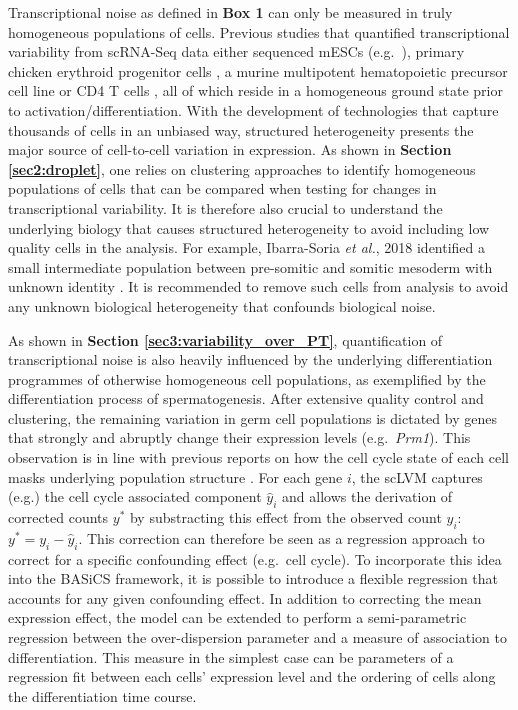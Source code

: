 Transcriptional noise as defined in \textbf{Box 1} can only be measured in truly homogeneous populations of cells. 
Previous studies that quantified transcriptional variability from scRNA-Seq data either sequenced mESCs (e.g.~\citep{Kolodziejczyk2015cell}), primary chicken erythroid progenitor cells \citep{Richard2016}, a murine multipotent hematopoietic precursor cell line \citep{Mojtahedi2016} or CD4\plus{} T cells \citep{Martinez-jimenez2017}, all of which reside in a homogeneous ground state prior to activation/differentiation. 
With the development of technologies that capture thousands of cells in an unbiased way, structured heterogeneity presents the major source of cell-to-cell variation in expression. 
As shown in \textbf{Section \ref{sec2:droplet}}, one relies on clustering approaches to identify homogeneous populations of cells that can be compared when testing for changes in transcriptional variability. 
It is therefore also crucial to understand the underlying biology that causes structured heterogeneity to avoid including low quality cells in the analysis. 
For example, Ibarra-Soria \emph{et al.}, 2018 identified a small intermediate population between pre-somitic and somitic mesoderm with unknown identity \citep{Ibarra-Soria2018}. 
It is recommended to remove such cells from analysis to avoid any unknown biological heterogeneity that confounds biological noise.

\newpage
 
As shown in \textbf{Section \ref{sec3:variability_over_PT}}, quantification of transcriptional noise is also heavily influenced by the underlying differentiation programmes of otherwise homogeneous cell populations, as exemplified by the differentiation process of spermatogenesis. 
After extensive quality control and clustering, the remaining variation in germ cell populations is dictated by genes that strongly and abruptly change their expression levels (e.g.~\textit{Prm1}). 
This observation is in line with previous reports on how the cell cycle state of each cell masks underlying population structure \citep{Buettner2015}. 
For each gene $i$, the \gls{scLVM} captures (e.g.) the cell cycle associated component $\hat{y}_i$ and allows the derivation of corrected counts $y^{\ast}$ by substracting this effect from the observed count $y_i$: $y^{\ast}=y_i-\hat{y}_i$. 
This correction can therefore be seen as a regression approach to correct for a specific confounding effect (e.g.~cell cycle). 
To incorporate this idea into the BASiCS framework, it is possible to introduce a flexible regression that accounts for any given confounding effect. 
In addition to correcting the mean expression effect, the model can be extended to perform a semi-parametric regression between the over-dispersion parameter and a measure of association to differentiation. 
This measure in the simplest case can be parameters of a regression fit between each cells' expression level and the ordering of cells along the differentiation time course. 

